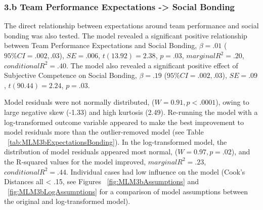 \documentclass[12pt]{report}
\begin{document}
{\subsubsection{3.b Team Performance Expectations -> Social Bonding} %

The direct relationship between expectations around team performance and social bonding was also tested.  The model revealed a significant positive relationship between Team Performance Expectations and Social Bonding, $\beta = .01$ ($95\% CI =  .002, .03$), $SE = .006$, $t(13.92) = 2.38$, $p = .03$, $marginal R^2 = .20$, $conditional R^2 = .40$.  The model also revealed a significant positive effect of Subjective Competence on Social Bonding, $\beta = .19$ ($95\% CI =  .002, .03$), $SE = .09$, $t(90.44) = 2.24$, $p = .03$.

Model residuals were not normally distributed, ($W = 0.91, p < .0001$), owing to large negative skew (-1.33) and high kurtosis  (2.49). Re-running the model with a log-transformed outcome variable appeared to make the best improvement to model residuals more than the outlier-removed model (see Table ~\ref{tab:MLM3bExpectationsBonding}). In the log-transformed model, the distribution of model residuals appeared most normal,  ($W = 0.97, p = .02$), and the R-squared values for the model improved, $marginal R^2 = .23$, $conditional R^2 = .44$.  Individual cases had low influence on the model (Cook's Distances all < .15, see Figures ~\ref{fig:MLM3bAssumptions} and ~\ref{fig:MLM3bLogAssumptions} for a comparison of model assumptions between the original and log-transformed model).



\restoregeometry

}
\end{document}
